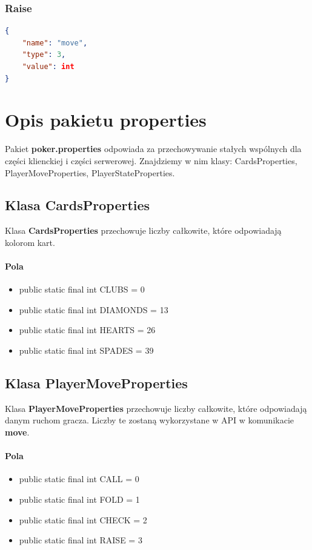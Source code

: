 \documentclass{article}
\begin{document}
        \subsubsection{Raise}
            \begin{lstlisting}[language=json,firstnumber=1]
{
    "name": "move",
    "type": 3,
    "value": int
}
            \end{lstlisting}


\section{Opis pakietu properties}
    Pakiet \textbf{poker.properties} odpowiada za przechowywanie stałych wspólnych dla części klienckiej i części serwerowej.
    Znajdziemy w nim klasy: CardsProperties, PlayerMoveProperties, PlayerStateProperties.
    
    \subsection{Klasa CardsProperties}
        Klasa \textbf{CardsProperties} przechowuje liczby całkowite, które odpowiadają kolorom kart.
        \paragraph{Pola}
            \begin{itemize}
                \item public static final int CLUBS = 0
                \item public static final int DIAMONDS = 13
                \item public static final int HEARTS = 26
                \item public static final int SPADES = 39
            \end{itemize}
            
    \subsection{Klasa PlayerMoveProperties}
        Klasa \textbf{PlayerMoveProperties} przechowuje liczby całkowite, które odpowiadają danym ruchom gracza.
        Liczby te zostaną wykorzystane w API w komunikacie \textbf{move}.
        \paragraph{Pola}
            \begin{itemize}
                \item public static final int CALL = 0
                \item public static final int FOLD = 1
                \item public static final int CHECK = 2
                \item public static final int RAISE = 3
            \end{itemize}
    
\end{document}
